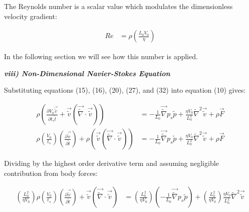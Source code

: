 \documentclass[titlepage]{article}
\begin{document}
\noindent The Reynolds number is a scalar value which modulates the dimensionless velocity gradient: 

\begin{align}
    Re &= \rho\left(\displaystyle\frac{L_{0}V_{0}}{\eta}\right)
\end{align}

\noindent In the following section we will see how this number is applied.

\newpage
\begin{center}
    \textbf{\emph{viii) Non-Dimensional Navier-Stokes Equation}}
\end{center}

\noindent Substituting equations (15), (16), (20), (27), and (32) into equation (10) gives: 

\begin{align}
    \rho\left(
        \displaystyle\frac{\partial{V_{0}\vec{\tilde{v}}}}{\partial{t_{s}\tilde{t}}}+\vec{\tilde{v}}\left(\vec{\tilde{\nabla}}\cdot\vec{\tilde{v}}\right)
    \right) 
    &= -\displaystyle\frac{1}{L_{0}}\vec{\tilde{\nabla}}p_{s}\tilde{p} + \displaystyle\frac{\eta{V_{0}}}{L_{0}^2}\tilde{\nabla}^2\vec{\tilde{v}} + \rho\vec{F} \\
    \rho\left(
        \displaystyle\frac{V_{0}}{t_{s}} 
        \right)\left(\displaystyle\frac{\partial{\vec{\tilde{v}}}}{\partial{\tilde{t}}}\right) + \rho\left(\vec{\tilde{v}}\left(\vec{\tilde{\nabla}}\cdot\vec{\tilde{v}}\right)
    \right)
    &= -\displaystyle\frac{1}{L_{0}}\vec{\tilde{\nabla}}p_{s}\tilde{p} + \displaystyle\frac{{\eta}{V_{0}}}{L_{0}^2}\tilde{\nabla}^2\vec{\tilde{v}} + \rho\vec{F}
\end{align}

\noindent Dividing by the highest order derivative term and assuming negligible contribution from body forces: 

\begin{align}
    \left(
        \displaystyle\frac{L_{0}^2}{\eta{V_{0}}}
    \right)
    \rho\left(
        \displaystyle\frac{V_{0}}{t_{s}} 
        \right)\left(\displaystyle\frac{\partial{\vec{\tilde{v}}}}{\partial{\tilde{t}}}\right) + \vec{\tilde{v}}\left(\vec{\tilde{\nabla}}\cdot\vec{\tilde{v}}\right)
    &= \left(\displaystyle\frac{L_{0}^2}{\eta{V_{0}}}\right)\left(-\displaystyle\frac{1}{L_{0}}\vec{\tilde{\nabla}}p_{s}\tilde{p}\right) + \left(
        \displaystyle\frac{L_{0}^2}{\eta{V_{0}}}
    \right) \displaystyle\frac{{\eta}{V_{0}}}{L_{0}^2}\tilde{\nabla}^2\vec{\tilde{v}} 
\end{align}
\end{document}
